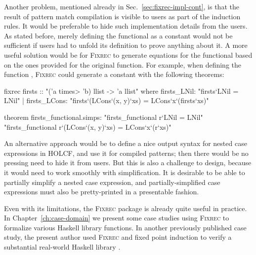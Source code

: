 Another problem, mentioned already in Sec.~\ref{sec:fixrec-impl-cont}, is that the result of pattern match compilation is visible to users as part of the induction rules. It would be preferable to hide such implementation details from the users. As stated before, merely defining the functional as a constant would not be sufficient if users had to unfold its definition to prove anything about it. A more useful solution would be for \textsc{Fixrec} to generate equations for the functional based on the ones provided for the original function. For example, when defining the function , \textsc{Fixrec} could generate a constant  with the following theorems:
%
\begin{isacode}
fixrec firsts :: "('a \<times> 'b) llist -> 'a llist"
  where firsts_LNil: "firsts`LNil = LNil"
  | firsts_LCons: "firsts`(LCons`(x, y)`xs) = LCons`x`(firsts`xs)"
\end{isacode}
\unmedskip
{}
\begin{isacode}
theorem firsts_functional.simps:
  "firsts_functional r`LNil = LNil"
  "firsts_functional r`(LCons`(x, y)`xs) = LCons`x`(r`xs)"
\end{isacode}
%
An alternative approach would be to define a nice output syntax for nested case expressions in HOLCF, and use it for compiled patterns; then there would be no pressing need to hide it from users. But this is also a challenge to design, because it would need to work smoothly with simplification. It is desirable to be able to partially simplify a nested case expression, and partially-simplified case expressions must also be pretty-printed in a presentable fashion.

Even with its limitations, the \textsc{Fixrec} package is already quite useful in practice. In Chapter~\ref{ch:case-domain} we present some case studies using \textsc{Fixrec} to formalize various Haskell library functions. In another previously published case study, the present author used \textsc{Fixrec} and fixed point induction to verify a substantial real-world Haskell library \cite{afp09}.


